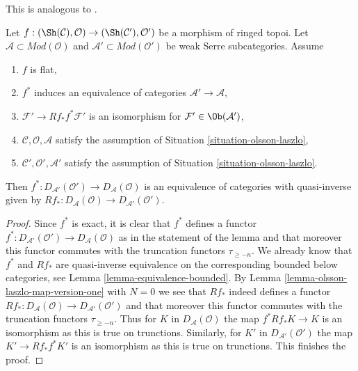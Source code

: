 \begin{lemma}
\label{lemma-equivalence-unbounded-one}
\begin{reference}
This is analogous to \cite[Theorem 2.2.3]{six-I}.
\end{reference}
Let $f : (\Sh(\mathcal{C}), \mathcal{O}) \to (\Sh(\mathcal{C}'), \mathcal{O}')$
be a morphism of ringed topoi.
Let $\mathcal{A} \subset \textit{Mod}(\mathcal{O})$
and $\mathcal{A}' \subset \textit{Mod}(\mathcal{O}')$
be weak Serre subcategories. Assume
\begin{enumerate}
\item $f$ is flat,
\item $f^*$ induces an equivalence of categories
$\mathcal{A}' \to \mathcal{A}$,
\item $\mathcal{F}' \to Rf_*f^*\mathcal{F}'$ is an isomorphism
for $\mathcal{F}' \in \Ob(\mathcal{A}')$,
\item $\mathcal{C}, \mathcal{O}, \mathcal{A}$ satisfy the
assumption of Situation \ref{situation-olsson-laszlo},
\item $\mathcal{C}', \mathcal{O}', \mathcal{A}'$ satisfy the
assumption of Situation \ref{situation-olsson-laszlo}.
\end{enumerate}
Then $f^* : D_{\mathcal{A}'}(\mathcal{O}') \to D_\mathcal{A}(\mathcal{O})$
is an equivalence of categories with quasi-inverse given by
$Rf_* : D_\mathcal{A}(\mathcal{O}) \to D_{\mathcal{A}'}(\mathcal{O}')$.
\end{lemma}

\begin{proof}
Since $f^*$ is exact, it is clear that $f^*$ defines a functor
$f^* : D_{\mathcal{A}'}(\mathcal{O}') \to D_\mathcal{A}(\mathcal{O})$
as in the statement of the lemma and that moreover this
functor commutes with the truncation functors $\tau_{\geq -n}$.
We already know that $f^*$ and $Rf_*$ are quasi-inverse
equivalence on the corresponding bounded below categories,
see Lemma \ref{lemma-equivalence-bounded}.
By Lemma \ref{lemma-olsson-laszlo-map-version-one}
with $N = 0$ we see that $Rf_*$ indeed defines a functor
$Rf_* : D_\mathcal{A}(\mathcal{O}) \to D_{\mathcal{A}'}(\mathcal{O}')$
and that moreover this functor commutes with
the truncation functors $\tau_{\geq -n}$.
Thus for $K$ in $D_\mathcal{A}(\mathcal{O})$ the map
$f^*Rf_*K \to K$ is an isomorphism as this is true
on trunctions.
Similarly, for $K'$ in $D_{\mathcal{A}'}(\mathcal{O}')$ the map
$K' \to Rf_*f^*K'$ is an isomorphism as this is true
on trunctions.
This finishes the proof.
\end{proof}

